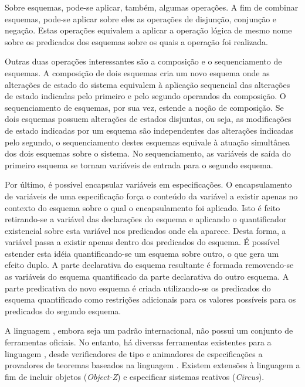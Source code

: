 Sobre esquemas, pode-se aplicar, também, algumas operações.
A fim de combinar esquemas, pode-se aplicar sobre eles as operações de disjunção, conjunção e negação.
Estas operações equivalem a aplicar a operação lógica de mesmo nome sobre os predicados dos esquemas sobre os quais a operação foi realizada.

Outras duas operações interessantes são a composição e o sequenciamento de esquemas.
A composição de dois esquemas cria um novo esquema onde as alterações de estado do sistema equivalem à aplicação sequencial das alterações de estado indicadas pelo primeiro e pelo segundo operandos da composição.
O sequenciamento de esquemas, por sua vez, estende a noção de composição.
Se dois esquemas possuem alterações de estados disjuntas, ou seja, as modificações de estado indicadas por um esquema são independentes das alterações indicadas pelo segundo, o sequenciamento destes esquemas equivale à atuação simultânea dos dois esquemas sobre o sistema.
No sequenciamento, as variáveis de saída do primeiro esquema se tornam variáveis de entrada para o segundo esquema.

Por último, é possível encapsular variáveis em especificações.
O encapsulamento de variáveis de uma especificação força o conteúdo da variável a existir apenas no contexto do esquema sobre o qual o encapsulamento foi aplicado.
Isto é feito retirando-se a variável das declarações do esquema e aplicando o quantificador existencial sobre esta variável nos predicados onde ela aparece.
Desta forma, a variável passa a existir apenas dentro dos predicados do esquema.
É possível estender esta idéia quantificando-se um esquema sobre outro, o que gera um efeito duplo.
A parte declarativa do esquema resultante é formada removendo-se as variáveis do esquema quantificado da parte declarativa do outro esquema.
A parte predicativa do novo esquema é criada utilizando-se os predicados do esquema quantificado como restrições adicionais para os valores possíveis para os predicados do segundo esquema.

A linguagem \Z, embora seja um padrão internacional, não possui um conjunto de ferramentas oficiais.
No entanto, há diversas ferramentas existentes para a linguagem \cite{FMWikiZ}, desde verificadores de tipo e animadores de especificações a provadores de teoremas baseados na linguagem \HOL.
Existem extensões à linguagem a fim de incluir objetos (\textit{Object-Z}\cite{ObjectZ}) e especificar sistemas reativos (\textit{Circus}\cite{Circus}).

